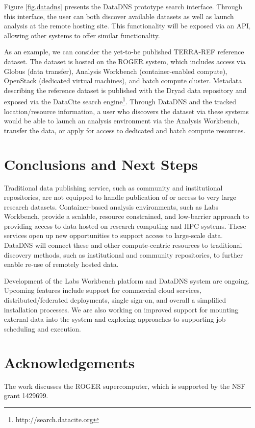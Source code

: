 \documentclass{sig-alternate}
\begin{document}
Figure \ref{fig.datadns} presents the DataDNS prototype search interface. Through this interface, the user can both discover available datasets as well as launch analysis at the remote hosting site. This functionality will be exposed via an API, allowing other systems to offer similar functionality.

As an example, we can consider the yet-to-be published TERRA-REF reference dataset. The dataset is hosted on the ROGER system, which includes access via Globus (data transfer), Analysis Workbench (container-enabled compute), OpenStack (dedicated virtual machines), and batch compute cluster.  Metadata describing the reference dataset is published with the Dryad data repository and exposed via the DataCite search engine\footnote{http://search.datacite.org}. Through DataDNS and the tracked location/resource information, a user who discovers the dataset via these systems would be able to launch an analysis environment via the Analysis Workbench, transfer the data, or apply for access to dedicated and batch compute resources.


\section{Conclusions and Next Steps}

Traditional data publishing service, such as community and institutional repositories, are not equipped to handle publication of or access to very large research datasets.  Container-based analysis environments, such as Labs Workbench, provide a scalable, resource constrained, and low-barrier approach to providing access to data hosted on research computing and HPC systems. These services open up  new opportunities to support access to large-scale data.  DataDNS will connect these and other compute-centric resources to traditional discovery methods, such as institutional and community repositories, to further enable re-use of remotely hosted data.

Development of the Labs Workbench platform and DataDNS system are ongoing.  Upcoming features include support for commercial cloud services, distributed/federated deployments, single sign-on, and overall a simplified installation processes. We are also working on improved support for mounting external data into the system and exploring approaches to supporting job scheduling and execution.

\section{Acknowledgements}
The work discusses the ROGER supercomputer, which is supported by the NSF grant 1429699. 


  
\end{document}
